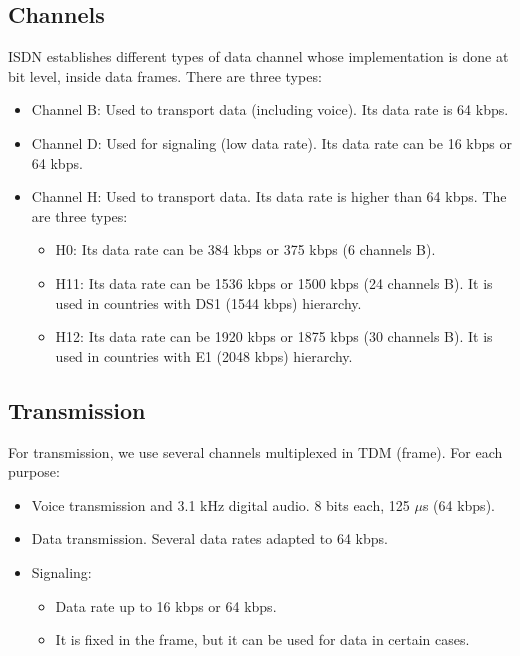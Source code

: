 \documentclass[../main.tex]{subfiles}
\begin{document}
\subsection{Channels}

ISDN establishes different types of data channel whose implementation is done at bit level, inside data frames. There are three types:

\begin{itemize}
	\item Channel B: Used to transport data (including voice). Its data rate is 64 kbps.
	\item Channel D: Used for signaling (low data rate). Its data rate can be 16 kbps or 64 kbps.
	\item {
		Channel H: Used to transport data. Its data rate is higher than 64 kbps. The are three types:
		\begin{itemize}
			\item H0: Its data rate can be 384 kbps or 375 kbps (6 channels B).
			\item H11: Its data rate can be 1536 kbps or 1500 kbps (24 channels B). It is used in countries with DS1 (1544 kbps) hierarchy.
			\item H12: Its data rate can be 1920 kbps or 1875 kbps (30 channels B). It is used in countries with E1 (2048 kbps) hierarchy.
		\end{itemize}
	}
\end{itemize}

\subsection{Transmission}

For transmission, we use several channels multiplexed in TDM (frame). For each purpose:

\begin{itemize}
	\item Voice transmission and 3.1 kHz digital audio. 8 bits each, 125 $\mu$s (64 kbps).
	\item Data transmission. Several data rates adapted to 64 kbps.
	\item {
		Signaling:
		\begin{itemize}
			\item Data rate up to 16 kbps or 64 kbps.
			\item It is fixed in the frame, but it can be used for data in certain cases.
		\end{itemize}
	}
\end{itemize}
\end{document}
